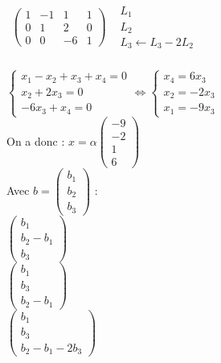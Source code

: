 \documentclass[11pt, fleqn]{report}
\begin{document}
\noindent $
\begin{array}{cc}
	\left(\begin{array}{cccc}
		1 & -1 & 1 & 1 \\
		0 & 1 & 2 & 0 \\
		0 & 0 & -6 & 1
	\end{array}\right)
	& \begin{array}{l}
	L_1\\
	L_2 \\
	L_3 \leftarrow L_3-2L_2
	\end{array}
\end{array}	 $ 
\\
\\
$ \begin{cases}
	x_1-x_2+x_3+x_4 = 0 \\
	x_2+2x_3 = 0 \\
	-6x_3+x_4 = 0
\end{cases} 
\Leftrightarrow
\begin{cases}
	x_4 = 6x_3\\
	x_2 = -2x_3\\
	x_1 = -9x_3
\end{cases}$
\\
On a donc : $x=\alpha \left(\begin{array}{c} -9\\-2\\1\\6 \end{array}\right)$
\\
Avec $b=\left(\begin{array}{l}b_1 \\b_2 \\b_3\end{array}\right)$ : 
\\
$\left(\begin{array}{l}b_1 \\b_2-b_1 \\b_3\end{array}\right)$
\\
$\left(\begin{array}{l}b_1 \\b_3\\b_2-b_1\end{array}\right)$
\\
$\left(\begin{array}{l}b_1 \\b_3\\b_2-b_1-2b_3\end{array}\right)$
\\
\end{document}
